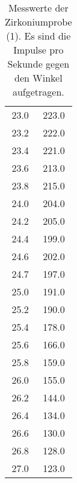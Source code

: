 \begin{table}[h]
\begin{tabular}{S S}
    23.0 & 223.0\\
    23.2 & 222.0\\
    23.4 & 221.0\\
    23.6 & 213.0\\
    23.8 & 215.0\\
    24.0 & 204.0\\
    24.2 & 205.0\\
    24.4 & 199.0\\
    24.6 & 202.0\\
    24.7 & 197.0\\
    25.0 & 191.0\\
    25.2 & 190.0\\
    25.4 & 178.0\\
    25.6 & 166.0\\
    25.8 & 159.0\\
    26.0 & 155.0\\
    26.2 & 144.0\\
    26.4 & 134.0\\
    26.6 & 130.0\\
    26.8 & 128.0\\
    27.0 & 123.0\\
    \bottomrule
  \end{tabular}
  \caption{Messwerte der Zirkoniumprobe (1). Es sind die
  Impulse pro Sekunde gegen den Winkel aufgetragen.}
  \label{tab:zirkonium1}
\end{table}

